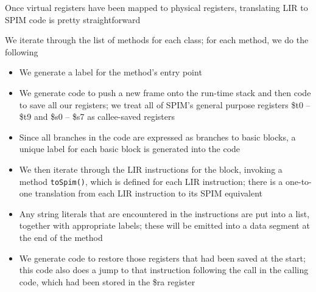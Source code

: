 \documentclass[8pt,a4paper,compress]{beamer}
\begin{document}
\begin{frame}[fragile]
\pause

Once virtual registers have been mapped to physical registers, translating LIR to SPIM code is pretty straightforward

\pause
\bigskip

We iterate through the list of methods for each class; for each method, we do the following
\begin{itemize}
\item We generate a label for the method's entry point

\item We generate code to push a new frame onto the run-time stack and then code to save all our registers; we treat all of SPIM's general purpose registers \$t0 -- \$t9 and \$s0 -- \$s7 as callee-saved registers

\item Since all branches in the code are expressed as branches to basic blocks, a unique label for each basic block is generated into the code

\item We then iterate through the LIR instructions for the block, invoking a method \lstinline{toSpim()}, which is defined for each LIR instruction; there is a one-to-one translation from each LIR instruction to its SPIM equivalent

\item Any string literals that are encountered in the instructions are put into a list, together with appropriate labels; these will be emitted into a data segment at the end of the method

\item We generate code to restore those registers that had been saved at the start; this code also does a jump to that instruction following the call in the calling code, which had been stored in the \$ra register
\end{itemize}
\end{frame}
\end{document}
